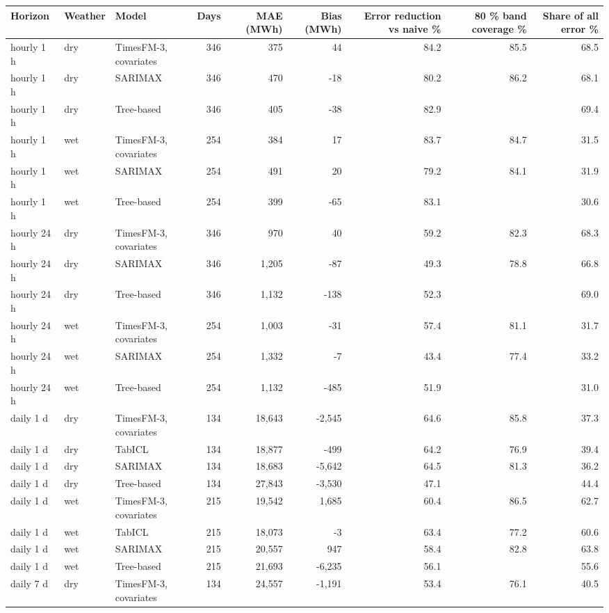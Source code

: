 \begin{tabular}{lllrrrrrr}
\toprule
Horizon & Weather & Model & Days & MAE (MWh) & Bias (MWh) & Error reduction vs naive \% & 80 \% band coverage \% & Share of all error \% \\
\midrule
hourly 1 h & dry & TimesFM-3, covariates & 346 & 375 & 44 & 84.2 & 85.5 & 68.5 \\
hourly 1 h & dry & SARIMAX & 346 & 470 & -18 & 80.2 & 86.2 & 68.1 \\
hourly 1 h & dry & Tree-based & 346 & 405 & -38 & 82.9 &  & 69.4 \\
hourly 1 h & wet & TimesFM-3, covariates & 254 & 384 & 17 & 83.7 & 84.7 & 31.5 \\
hourly 1 h & wet & SARIMAX & 254 & 491 & 20 & 79.2 & 84.1 & 31.9 \\
hourly 1 h & wet & Tree-based & 254 & 399 & -65 & 83.1 &  & 30.6 \\
hourly 24 h & dry & TimesFM-3, covariates & 346 & 970 & 40 & 59.2 & 82.3 & 68.3 \\
hourly 24 h & dry & SARIMAX & 346 & 1,205 & -87 & 49.3 & 78.8 & 66.8 \\
hourly 24 h & dry & Tree-based & 346 & 1,132 & -138 & 52.3 &  & 69.0 \\
hourly 24 h & wet & TimesFM-3, covariates & 254 & 1,003 & -31 & 57.4 & 81.1 & 31.7 \\
hourly 24 h & wet & SARIMAX & 254 & 1,332 & -7 & 43.4 & 77.4 & 33.2 \\
hourly 24 h & wet & Tree-based & 254 & 1,132 & -485 & 51.9 &  & 31.0 \\
daily 1 d & dry & TimesFM-3, covariates & 134 & 18,643 & -2,545 & 64.6 & 85.8 & 37.3 \\
daily 1 d & dry & TabICL & 134 & 18,877 & -499 & 64.2 & 76.9 & 39.4 \\
daily 1 d & dry & SARIMAX & 134 & 18,683 & -5,642 & 64.5 & 81.3 & 36.2 \\
daily 1 d & dry & Tree-based & 134 & 27,843 & -3,530 & 47.1 &  & 44.4 \\
daily 1 d & wet & TimesFM-3, covariates & 215 & 19,542 & 1,685 & 60.4 & 86.5 & 62.7 \\
daily 1 d & wet & TabICL & 215 & 18,073 & -3 & 63.4 & 77.2 & 60.6 \\
daily 1 d & wet & SARIMAX & 215 & 20,557 & 947 & 58.4 & 82.8 & 63.8 \\
daily 1 d & wet & Tree-based & 215 & 21,693 & -6,235 & 56.1 &  & 55.6 \\
daily 7 d & dry & TimesFM-3, covariates & 134 & 24,557 & -1,191 & 53.4 & 76.1 & 40.5 \\

\end{tabular}
